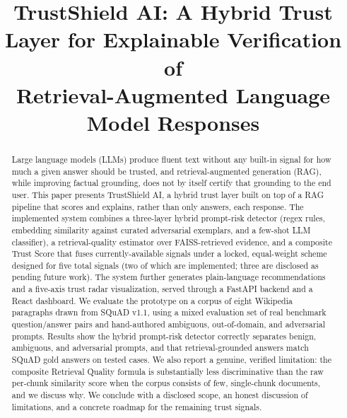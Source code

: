 \documentclass[conference]{IEEEtran}
\begin{document}
\title{TrustShield AI: A Hybrid Trust Layer for Explainable Verification of\\
Retrieval-Augmented Language Model Responses}

\author{
}

\maketitle

\begin{abstract}
Large language models (LLMs) produce fluent text without any built-in signal for how
much a given answer should be trusted, and retrieval-augmented generation (RAG), while
improving factual grounding, does not by itself certify that grounding to the end user.
This paper presents TrustShield AI, a hybrid trust layer built on top of a RAG pipeline
that scores and explains, rather than only answers, each response. The implemented
system combines a three-layer hybrid prompt-risk detector (regex rules, embedding
similarity against curated adversarial exemplars, and a few-shot LLM classifier), a
retrieval-quality estimator over FAISS-retrieved evidence, and a composite Trust Score
that fuses currently-available signals under a locked, equal-weight scheme designed for
five total signals (two of which are implemented; three are disclosed as pending future
work). The system further generates plain-language recommendations and a five-axis trust
radar visualization, served through a FastAPI backend and a React dashboard. We evaluate
the prototype on a corpus of eight Wikipedia paragraphs drawn from SQuAD v1.1, using a
mixed evaluation set of real benchmark question/answer pairs and hand-authored
ambiguous, out-of-domain, and adversarial prompts. Results show the hybrid prompt-risk
detector correctly separates benign, ambiguous, and adversarial prompts, and that
retrieval-grounded answers match SQuAD gold answers on tested cases. We also report a
genuine, verified limitation: the composite Retrieval Quality formula is substantially
less discriminative than the raw per-chunk similarity score when the corpus consists of
few, single-chunk documents, and we discuss why. We conclude with a disclosed scope,
an honest discussion of limitations, and a concrete roadmap for the remaining trust
signals.
\end{abstract}
\end{document}
